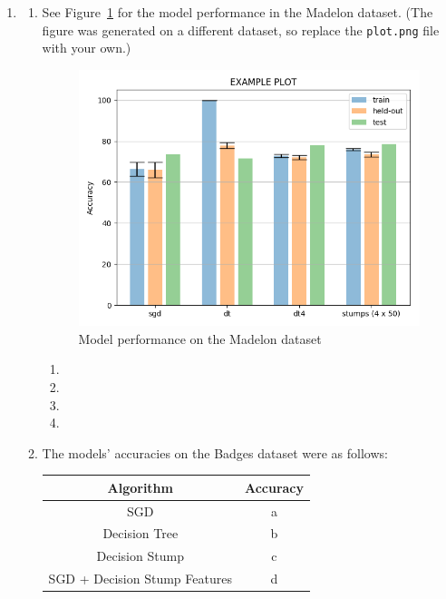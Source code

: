 \documentclass{article}
\begin{document}
\begin{enumerate}
        \item %
        \begin{enumerate}
            \item %
            See Figure~\ref{fig:model_performance} for the model performance in the Madelon dataset. (The figure was generated on a different dataset, so replace the \texttt{plot.png} file with your own.)
            \begin{figure}
                \centering
                \includegraphics[width=\textwidth]{plot.png}
                \caption{Model performance on the Madelon dataset}
                \label{fig:model_performance}
            \end{figure}

            \begin{enumerate}[1.]
                \item
                \item
                \item
                \item
            \end{enumerate}

            \item %
            The models' accuracies on the Badges dataset were as follows:
            \begin{center}
                \begin{tabular}{|c|c|}
                    \hline
                    Algorithm & Accuracy \\
                    \hline
                    SGD & a \\
                    Decision Tree & b \\
                    Decision Stump & c \\
                    SGD + Decision Stump Features & d \\
                    \hline
                \end{tabular}
            \end{center}


\end{enumerate}
\end{enumerate}
\end{document}
